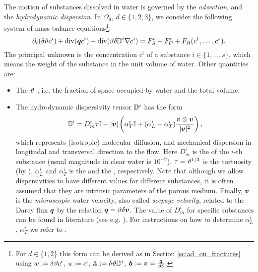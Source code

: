The motion of substances dissolved in water is governed by the \emph{advection}, and the \emph{hydrodynamic dispersion}.
In $\Omega_d$, $d\in\{1,2,3\}$, we consider the following system of mass balance equations\footnote{For $d\in\{1,2\}$ this form can be derived as in Section \ref{sc:ad_on_fractures} using $w:=\delta\vartheta c^i$, $u:=c^i$, ${\mathbb{A}}:=\delta\vartheta{\mathbb{D}}^i$, $\mathbf{\boldsymbol{b}}:=\mathbf{\boldsymbol{v}}=\frac{\mathbf{\boldsymbol{q}}}{\vartheta\delta}$.}:
\begin{equation}
    \label{e:ADE}
   \partial_t ( \delta \th c^i) + \div ( \vc q c^i ) - \div (\th \delta \D^i \grad c^i ) = F_S^i + F^c_C + F_R(c^1,\dots, c^s).
\end{equation}
The principal unknown is the concentration $c^i$  of a substance $i\in\{1,\dots, s\}$, which means the weight of the substance in the unit volume of water.
Other quantities are:
\begin{itemize}
\item The  $\vartheta$ \units{}{}{}, i.e. the fraction of space occupied by water and the total volume.
\item The hydrodynamic dispersivity tensor ${{\mathbb{D}}}^i$  has the form
\begin{equation} 
  \label{eqn:transport_disp}
  \D^i =D_m^i \tau \tn I + \abs{\vc v}\left(\alpha_T^i \tn I + (\alpha_L^i - \alpha_T^i) \frac{\vc v \otimes \vc v}{\abs{\vc v}^2}\right),
\end{equation}
which represents (isotropic) molecular diffusion, and mechanical dispersion in longitudal and transversal direction to the flow.
Here $D_m^i$  is the  of the $i$-th substance 
(usual magnitude in clear water is $10^{-9}$), $\tau=\vartheta^{1/3}$ is the tortuosity (by \cite{millington_quirk}), 
$\alpha_L^i$  and $\alpha_T^i$  is the  
and the , respectively.
Note that although we allow dispersivities to have different values for different substances, it is often assumed that they are intrinsic parameters
of the porous medium.
Finally, $\mathbf{\boldsymbol{v}}$  is the \emph{microscopic} water velocity, also called \emph{seepage velocity}, 
related to the Darcy flux $\mathbf{\boldsymbol{q}}$ by the relation $\mathbf{\boldsymbol{q}} = \vartheta\delta\mathbf{\boldsymbol{v}}$.
The value of $D_m^i$ for specific substances can be found in literature (see e.g. \cite{cislerova_vogel}).
For instructions on how to determine $\alpha_L^i$, $\alpha_T^i$ we refer to \cite{marsily,domenico_schwartz}.


\end{itemize}
